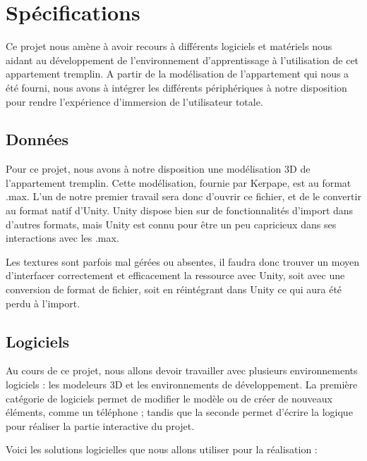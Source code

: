 \section{Spécifications}
	Ce projet nous amène à avoir recours à différents logiciels et matériels nous aidant au développement de l'environnement d'apprentissage à l'utilisation de cet appartement tremplin. A partir de la modélisation de l'appartement qui nous a été fourni, nous avons à intégrer les différents périphériques à notre disposition pour rendre l'expérience d'immersion de l'utilisateur totale.
\\
\subsection{Données}
	Pour ce projet, nous avons à notre disposition une modélisation 3D de l'appartement tremplin. Cette modélisation, fournie par Kerpape, est au format .max. L'un de notre premier travail sera donc d'ouvrir ce fichier, et de le convertir au format natif d'Unity. Unity dispose bien sur de fonctionnalités d'import dans d'autres formats, mais Unity est connu pour être un peu capricieux dans ses interactions avec les .max.

	Les textures sont parfois mal gérées ou absentes, il faudra donc trouver un moyen d'interfacer correctement et efficacement la ressource avec Unity, soit avec une conversion de format de fichier, soit en réintégrant dans Unity ce qui aura été perdu à l'import.

\subsection{Logiciels}
	Au cours de ce projet, nous allons devoir travailler avec plusieurs environnements logiciels : les modeleurs 3D et les environnements de développement. La première catégorie de logiciels permet de modifier le modèle ou de créer de nouveaux éléments, comme un téléphone ; tandis que la seconde permet d'écrire la logique pour réaliser la partie interactive du projet.

	Voici les solutions logicielles que nous allons utiliser pour la réalisation :
